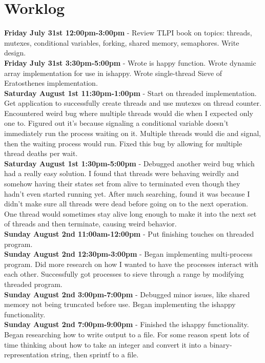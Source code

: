 \documentclass[11pt]{article}
\begin{document}
\section{Worklog}
\textbf{Friday July 31st 12:00pm-3:00pm} - Review TLPI book on topics: threads, mutexes, conditional variables, forking, shared memory, semaphores. Write design.\\
\textbf{Friday July 31st 3:30pm-5:00pm} - Wrote is happy function. Wrote dynamic array implementation for use in ishappy. Wrote single-thread Sieve of Eratosthenes implementation. \\
\textbf{Saturday August 1st 11:30pm-1:00pm} - Start on threaded implementation. Get application to successfully create threads and use mutexes on thread counter. Encountered weird bug where multiple threads would die when I expected only one to. Figured out it's because signaling a conditional variable doesn't immediately run the process waiting on it. Multiple threads would die and signal, then the waiting process would run. Fixed this bug by allowing for multiple thread deaths per wait.\\
\textbf{Saturday August 1st 1:30pm-5:00pm} - Debugged another weird bug which had a really easy solution. I found that threads were behaving weirdly and somehow having their states set from alive to terminated even though they hadn't even started running yet. After much searching, found it was because I didn't make sure all threads were dead before going on to the next operation. One thread would sometimes stay alive long enough to make it into the next set of threads and then terminate, causing weird behavior. \\
\textbf{Sunday August 2nd 11:00am-12:00pm} - Put finishing touches on threaded program. \\
\textbf{Sunday August 2nd 12:30pm-3:00pm} - Began implementing multi-process program. Did more research on how I wanted to have the processes interact with each other. Successfully got processes to sieve through a range by modifying threaded program.\\
\textbf{Sunday August 2nd 3:00pm-7:00pm} - Debugged minor issues, like shared memory not being truncated before use. Began implementing the ishappy functionality. \\
\textbf{Sunday August 2nd 7:00pm-9:00pm} - Finished the ishappy functionality. Began researching how to write output to a file. For some reason spent lots of time thinking about how to take an integer and convert it into a binary-representation string, then sprintf to a file. \\
\end{document}

